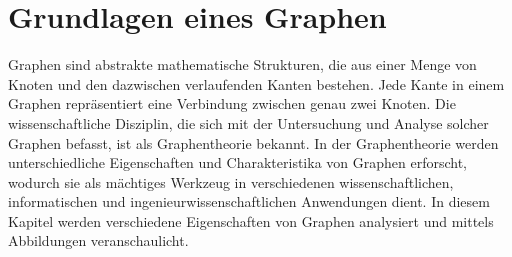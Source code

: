 \section{Grundlagen eines Graphen}

Graphen sind abstrakte mathematische Strukturen, die aus einer Menge von Knoten und den dazwischen verlaufenden Kanten bestehen. Jede Kante in einem Graphen repräsentiert eine Verbindung zwischen genau zwei Knoten. Die wissenschaftliche Disziplin, die sich mit der Untersuchung und Analyse solcher Graphen befasst, ist als Graphentheorie bekannt. In der Graphentheorie werden unterschiedliche Eigenschaften und Charakteristika von Graphen erforscht, wodurch sie als mächtiges Werkzeug in verschiedenen wissenschaftlichen, informatischen und ingenieurwissenschaftlichen Anwendungen dient. In diesem Kapitel werden verschiedene Eigenschaften von Graphen analysiert und mittels Abbildungen veranschaulicht. \cite{ohlbach2018graphen}